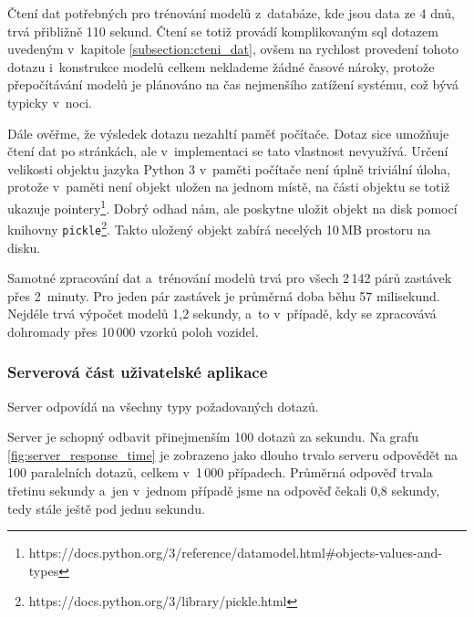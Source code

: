 Čtení dat potřebných pro trénování modelů z~databáze, kde jsou data ze 4 dnů, trvá přibližně 110 sekund. Čtení se totiž provádí komplikovaným \gls{sql} dotazem uvedeným v~kapitole \ref{subsection:cteni_dat}, ovšem na rychlost provedení tohoto dotazu i~konstrukce modelů celkem neklademe žádné časové nároky, protože přepočítávání modelů je plánováno na čas nejmenšího zatížení systému, což bývá typicky v~noci.

\bigbreak

Dále ověřme, že výsledek dotazu nezahltí paměť počítače. Dotaz sice umožňuje čtení dat po stránkách, ale v~implementaci se tato vlastnost nevyužívá. Určení velikosti objektu jazyka Python 3 v~paměti počítače není úplně triviální úloha, protože v~paměti není objekt uložen na jednom místě, na části objektu se totiž ukazuje pointery\footnote{https://docs.python.org/3/reference/datamodel.html\#objects-values-and-types}. Dobrý odhad nám, ale poskytne uložit objekt na disk pomocí knihovny \verb-pickle-\footnote{https://docs.python.org/3/library/pickle.html}. Takto uložený objekt zabírá necelých 10\,MB prostoru na disku.


\bigbreak

Samotné zpracování dat a~trénování modelů trvá pro všech 2\,142 párů zastávek přes 2~minuty. Pro jeden pár zastávek je průměrná doba běhu 57 milisekund. Nejdéle trvá výpočet modelů 1,2 sekundy, a~to v~případě, kdy se zpracovává dohromady přes 10\,000 vzorků poloh vozidel.


\subsubsection{Serverová část uživatelské aplikace}

Server odpovídá na všechny typy požadovaných dotazů.

\bigbreak

Server je schopný odbavit přinejmenším 100 dotazů za sekundu. Na grafu \ref{fig:server_response_time} je zobrazeno jako dlouho trvalo serveru odpovědět na 100 paralelních dotazů, celkem v~1\,000 případech. Průměrná odpověď trvala třetinu sekundy a~jen v~jednom případě jsme na odpověď čekali 0,8 sekundy, tedy stále ještě pod jednu sekundu.


